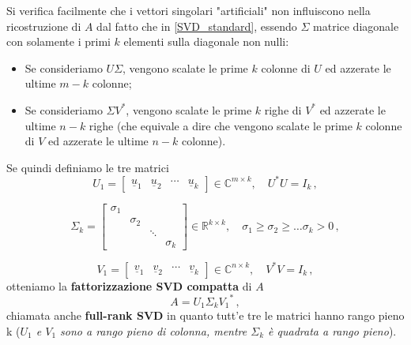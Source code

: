 Si verifica facilmente che i vettori singolari "artificiali" non influiscono 
nella ricostruzione di $A$ dal fatto che in \eqref{SVD_standard}, essendo 
$\Sigma$ matrice diagonale con solamente i primi $k$ elementi sulla diagonale 
non nulli:
\begin{itemize}
	\item Se consideriamo $U \Sigma$, vengono scalate le prime $k$ colonne di $U$ 
ed azzerate le ultime $m-k$ colonne;
	
	\item Se consideriamo $\Sigma V^*$, vengono scalate le prime $k$ righe di $V^*$ 
ed azzerate le ultime $n-k$ righe (che equivale a dire che vengono scalate le 
prime $k$ colonne di $V$ ed azzerate le ultime $n-k$ colonne).
\end{itemize}

Se quindi definiamo le tre matrici
\begin{equation*}  
U_{1} = \begin{bmatrix}
\underline{u}_1 & \underline{u}_2 & \cdots & \underline{u}_k
\end{bmatrix}
\in \mathbb{C}^{m \times k},
\quad U^*U = I_k \,,
\end{equation*}

\begin{equation*}  
\Sigma_{k} = \begin{bmatrix}
\sigma_1 & & & \\
& \sigma_2 & & \\
& & \ddots & \\
& & & \sigma_k
\end{bmatrix} \in \mathbb{R}^{k \times k},
\quad \sigma_1 \geq \sigma_2 \geq \ldots \sigma_k > 0 \,,
\end{equation*}

\begin{equation*}  
V_{1} = \begin{bmatrix}
\underline{v}_1 & \underline{v}_2 & \cdots & \underline{v}_k
\end{bmatrix}
\in \mathbb{C}^{n \times k},
\quad V^*V = I_k \,,
\end{equation*}
otteniamo la \textbf{fattorizzazione SVD compatta} di $A$
\begin{equation}\label{SVD_compact}
A = U_1 \Sigma_k {V_1}^* \,,
\end{equation}
chiamata anche \textbf{full-rank SVD} in quanto tutt'e tre le matrici hanno 
rango pieno k (\textit{$U_1$ e $V_1$ sono a rango pieno di colonna, mentre 
$\Sigma_k$ è quadrata a rango pieno}).


